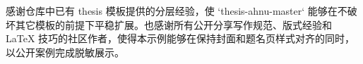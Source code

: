 感谢仓库中已有 thesis 模板提供的分层经验，使 `thesis-ahnu-master` 能够在不破坏其它模板的前提下平稳扩展。也感谢所有公开分享写作规范、版式经验和 LaTeX 技巧的社区作者，使得本示例能够在保持封面和题名页样式对齐的同时，以公开案例完成脱敏展示。
